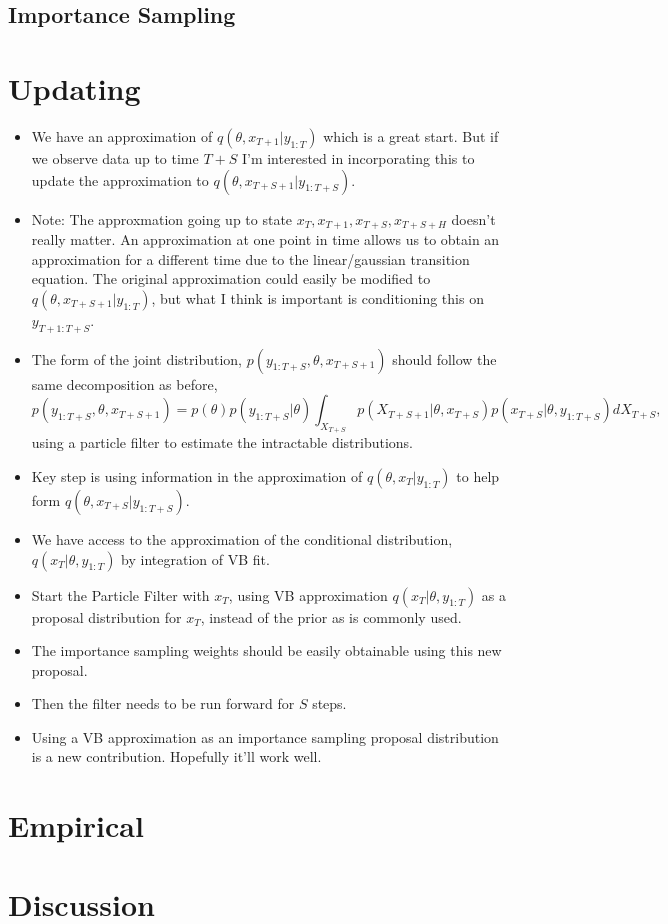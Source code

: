 \documentclass[12pt,a4paper]{article}%
\numberwithin{equation}{section}
\begin{document}
\subsection{Importance Sampling}

\citep{Sakaya2017}


\section{Updating}

\begin{itemize}
\item We have an approximation of $q(\theta, x_{T+1} | y_{1:T})$ which is a great start. But if we observe data up to time $T+S$ I'm interested in incorporating this to update the approximation to $q(\theta, x_{T+S+1} | y_{1:T+S})$.
\item Note: The approxmation going up to state $x_T, x_{T+1}, x_{T+S}, x_{T+S+H}$ doesn't really matter. An approximation at one point in time allows us to obtain an approximation for a different time due to the linear/gaussian transition equation. The original approximation could easily be modified to $q(\theta, x_{T+S+1} | y_{1:T})$, but what I think is important is conditioning this on $y_{T+1:T+S}$.
\item The form of the joint distribution, $p(y_{1:T+S}, \theta, x_{T+S+1})$ should follow the same decomposition as before,
$$p(y_{1:T+S}, \theta, x_{T+S+1}) = p(\theta) p(y_{1:T+S} | \theta) \int_{X_{T+S}} p(X_{T+S+1} | \theta, x_{T+S})p(x_{T+S} | \theta, y_{1:T+S})dX_{T+S},$$
using a particle filter to estimate the intractable distributions.
\item Key step is using information in the approximation of $q(\theta, x_T | y_{1:T})$ to help form $q(\theta, x_{T+S} | y_{1:T+S})$.
\item We have access to the approximation of the conditional distribution, $q(x_T | \theta, y_{1:T})$ by integration of VB fit.
\item Start the Particle Filter with $x_T$, using VB approximation $q(x_T | \theta, y_{1:T})$ as a proposal distribution for $x_T$, instead of the prior as is commonly used.
\item The importance sampling weights should be easily obtainable using this new proposal.
\item Then the filter needs to be run forward for $S$ steps.
\item Using a VB approximation as an importance sampling proposal distribution is a new contribution. Hopefully it'll work well.
\end{itemize}



\section{Empirical}

\section{Discussion}



 
\end{document}
